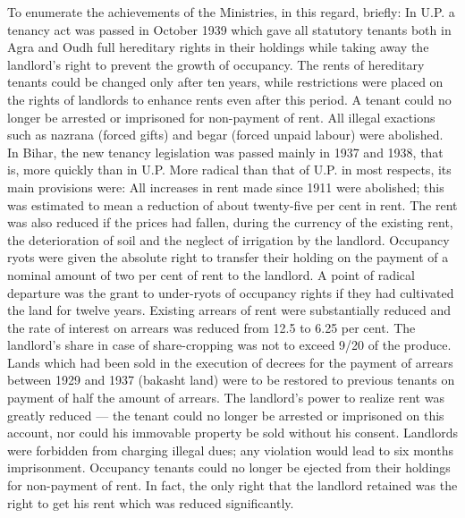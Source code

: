 To enumerate the achievements of the Ministries, in this regard, briefly: In U.P. a tenancy act was passed in October 1939 which gave all statutory tenants both in Agra and Oudh full hereditary rights in their holdings while taking away the landlord's right to prevent the growth of occupancy. The rents of hereditary tenants could be changed only after ten years, while restrictions were placed on the rights of landlords to enhance rents even after this period. A tenant could no longer be arrested or imprisoned for non-payment of rent. All illegal exactions such as nazrana (forced gifts) and begar (forced unpaid labour) were abolished. In Bihar, the new tenancy legislation was passed mainly in 1937 and 1938, that is, more quickly than in U.P. More radical than that of U.P. in most respects, its main provisions were: All increases in rent made since 1911 were abolished; this was estimated to mean a reduction of about twenty-five per cent in rent. The rent was also reduced if the prices had fallen, during the currency of the existing rent, the deterioration of soil and the neglect of irrigation by the landlord. Occupancy ryots were given the absolute right to transfer their holding on the payment of a nominal amount of two per cent of rent to the landlord. A point of radical departure was the grant to under-ryots of occupancy rights if they had cultivated the land for twelve years. Existing arrears of rent were substantially reduced and the rate of interest on arrears was reduced from 12.5 to 6.25 per cent. The landlord's share in case of share-cropping was not to exceed 9/20 of the produce. Lands which had been sold in the execution of decrees for the payment of arrears between 1929 and 1937 (bakasht land) were to be restored to previous tenants on payment of half the amount of arrears. The landlord's power to realize rent was greatly reduced --- the tenant could no longer be arrested or imprisoned on this account, nor could his immovable property be sold without his consent. Landlords were forbidden from charging illegal dues; any violation would lead to six months imprisonment. Occupancy tenants could no longer be ejected from their holdings for non-payment of rent. In fact, the only right that the landlord retained was the right to get his rent which was reduced significantly. 

